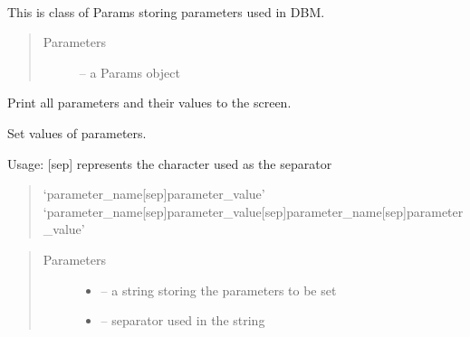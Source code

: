 \documentclass[letterpaper,10pt,english]{sphinxmanual}
\begin{document}
\begin{fulllineitems}
\label{\detokenize{index:dbm_py.interface.Params}}~

\begin{fulllineitems}
\label{\detokenize{index:dbm_py.interface.Params.__init__}}
This is class of Params storing parameters used in DBM.
\begin{quote}\begin{description}
\item[{Parameters}] \leavevmode
{} -- a Params object

\end{description}\end{quote}

\end{fulllineitems}


\begin{fulllineitems}
\label{\detokenize{index:dbm_py.interface.Params.print_all}}
Print all parameters and their values to the screen.

\end{fulllineitems}


\begin{fulllineitems}
\label{\detokenize{index:dbm_py.interface.Params.set_params}}
Set values of parameters.

Usage: {[}sep{]} represents the character used as the separator
\begin{quote}

`parameter\_name{[}sep{]}parameter\_value'
`parameter\_name{[}sep{]}parameter\_value{[}sep{]}parameter\_name{[}sep{]}parameter\_value'
\end{quote}
\begin{quote}\begin{description}
\item[{Parameters}] \leavevmode\begin{itemize}
\item {} 
 -- a string storing the parameters to be set

\item {} 
 -- separator used in the string

\end{itemize}

\end{description}\end{quote}

\end{fulllineitems}


\end{fulllineitems}
\end{document}
